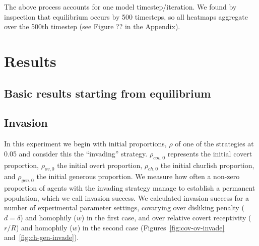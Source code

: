 \documentclass[11pt,letterpaper]{article}
\begin{document}
The above process accounts for one model timestep/iteration. We found by
inspection that equilibrium occurs by 500 timesteps, so all heatmaps aggregate
over the 500th timestep (see Figure ?? in the Appendix). 

\section{Results}

\subsection{Basic results starting from equilibrium}

\subsection{Invasion}

In this experiment we begin with initial proportions, $\rho$ of one of the strategies
at 0.05 and consider this the ``invading'' strategy. $\rho_{cov,0}$ represents
the initial covert proportion, $\rho_{ov,0}$ the initial overt proportion,
$\rho_{ch,0}$ the initial churlish proportion, and $\rho_{gen,0}$ the 
initial generous proportion. We measure how often
a non-zero proportion of agents with the invading strategy manage to 
establish a permanent population, which we call invasion success. We calculated
invasion success for a number of experimental parameter settings, covarying
over disliking penalty ($d=\delta$) and homophily ($w$) in the first case,
and over relative covert receptivity ($r/R$) and homophily ($w$) 
in the second case (Figures~\ref{fig:cov-ov-invade} and~\ref{fig:ch-gen-invade}).
\end{document}
